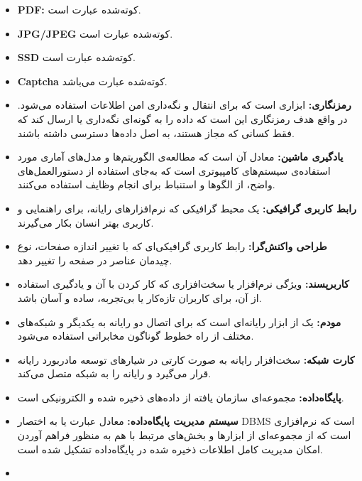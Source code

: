 \documentclass[12pt]{article}
\begin{document}
\begin{itemize}
		\item
		\textbf{PDF:\label{ref:pdf}}
		کوته‌شده عبارت
		است.
		\item
		\textbf{JPG/JPEG\label{ref:jpg}}
		کوته‌شده عبارت
		است.
		\item
		\textbf{SSD\label{ref:ssd}}
		کوته‌شده‌ عبارت
		است.
		\item
		\textbf{Captcha\label{ref:captcha}}
		کوته‌شده عبارت
		می‌باشد.
		\item
		\textbf{رمزنگاری:\label{ref:enc}}
		ابزاری است که برای انتقال و نگه‌داری امن اطلاعات استفاده می‌شود. در واقع هدف رمزنگاری این است که داده را به گونه‌ای نگه‌داری یا ارسال کند که فقط کسانی که مجاز هستند، به اصل داده‌ها دسترسی داشته باشند.
		\item
		\textbf{یادگیری ماشین:\label{ref:ml}}
		معادل آن
		است که مطالعه‌ی الگوریتم‌ها و مدل‌های آماری مورد استفاده‌ی سیستم‌های کامپیوتری است که به‌جای استفاده از دستورالعمل‌های واضح، از الگوها و استنباط برای انجام وظایف استفاده می‌کنند.
		\item
		\textbf{رابط کاربری گرافیکی:\label{ref:gui}}
		یک محیط گرافیکی که نرم‌افزارهای رایانه، برای راهنمایی و کاربری بهتر انسان بکار می‌گیرند.
		\item
		\textbf{طراحی واکنش‌گرا:‌\label{ref:responsive}}
		رابط کاربری گرافیکی‌ای که با تغییر اندازه صفحات، نوع چیدمان عناصر در صفحه را تغییر دهد.
		\item
		\textbf{کاربر‌پسند:}
		ویژگی نرم‌‏افزار یا سخت‏‌افزاری که کار کردن با آن و یادگیری استفاده از آن، برای کاربران تازه‏‌کار یا بی‌‏تجربه، ساده و آسان باشد.
		\item
		\textbf{مودم:}
		یک از ابزار رایانه‌ای است که برای اتصال دو رایانه به یکدیگر و شبکه‌های مختلف از راه خطوط گوناگون مخابراتی استفاده می‌شود.
		\item
		\textbf{کارت شبکه:‌}
		سخت‌افزار رایانه به صورت کارتی در شیارهای توسعه مادربورد رایانه قرار می‌گیرد و رایانه را به شبکه متصل می‌کند.
		\item
		\textbf{پایگاه‌داده:}
		مجموعه‌ای سازمان یافته از داده‌های ذخیره شده و الکترونیکی است.
		\item
		\textbf{سیستم مدیریت پایگاه‌داده:}
		معادل عبارت
		یا به اختصار DBMS است که نرم‌افزاری است که از مجموعه‌ای از ابزارها و بخش‌های مرتبط با هم به منظور فراهم آوردن امکان مدیریت کامل اطلاعات ذخیره شده در پایگاه‌داده تشکیل شده است.
		\item

\end{itemize}
\end{document}
